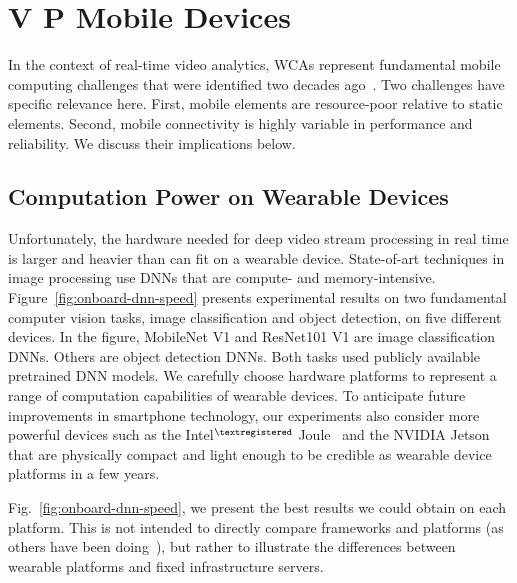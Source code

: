 \section{V P  Mobile Devices}
\label{bw:challenges}

In the context of real-time video analytics, WCAs represent fundamental mobile
computing challenges that were identified two decades ago~\cite{Satya1996}.  Two
challenges have specific relevance here. First, mobile elements are
resource-poor relative to static elements.  Second, mobile connectivity is
highly variable in performance and reliability.  We discuss their implications
below.


\subsection{\large Computation Power on Wearable Devices}
\label{bw:payload}

Unfortunately, the hardware needed for deep video stream processing in real time
is larger and heavier than can fit on a wearable device. State-of-art techniques
in image processing use DNNs that are compute- and memory-intensive.
Figure~\ref{fig:onboard-dnn-speed} presents experimental results on two
fundamental computer vision tasks, image classification and object detection, on
five different devices. In the figure, MobileNet V1 and ResNet101 V1 are image
classification DNNs. Others are object detection DNNs. Both tasks used publicly
available pretrained DNN models. We carefully choose hardware platforms to
represent a range of computation capabilities of wearable devices. To anticipate
future improvements in smartphone technology, our experiments also consider more
powerful devices such as the Intel$^{\tiny\textregistered}$
Joule~\cite{Hardawar2016} and the NVIDIA Jetson~\cite{NVIDIA2017} that are
physically compact and light enough to be credible as wearable device platforms
in a few years.

Fig.~\ref{fig:onboard-dnn-speed}, we present the best results we could obtain on
each platform. This is not intended to directly compare frameworks and platforms
(as others have been doing~\cite{Zhang2018pcamp}), but rather to illustrate the
differences between wearable platforms and fixed infrastructure servers. 


